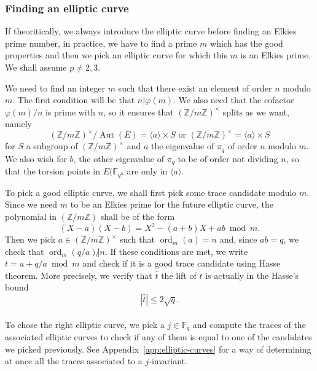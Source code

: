 \documentclass[12pt]{article}
\theoremstyle{plain}
\theoremstyle{definition}
\DeclareMathOperator{\order}{ord} %
\DeclareMathOperator{\Aut}{Aut}
\def\Z{\ensuremath{\mathbb{Z}}}
\def\F{\ensuremath{\mathbb{F}}}
\begin{document}
\subsubsection{Finding an elliptic curve}
If theoritically, we always introduce the elliptic curve before finding an
Elkies prime number, in practice, we have to find a prime $m$ which has the good
properties and then we pick an elliptic curve for which this $m$ is an Elkies
prime. We shall assume $p\neq2,3$.

We need to find an integer $m$ such that there exist an element of order $n$
modulo $m$. The first condition will be that $n|\varphi(m)$. We also need 
that the cofactor $\varphi(m)/n$ is prime with $n$, so it ensures that 
$(\Z/m\Z)^{\times}$ splits as we want, namely 
\begin{equation}
(\Z/m\Z)^{\times}/\Aut(E)=\langle{a}\rangle\times S \text{ or } 
(\Z/m\Z)^{\times}=\langle{a}\rangle\times S
\end{equation}
for $S$ a subgroup of $(\Z/m\Z)^{\times}$ and $a$ the eigenvalue of $\pi_q$ of
order $n$ modulo $m$. We also wish for $b$, the other eigenvalue of $\pi_q$ to
be of order not dividing $n$, so that the torsion points in $E(\F_{q^n}$ are
only in $\langle{a}\rangle$.

To pick a good elliptic curve, we shall first pick some trace candidate modulo 
$m$. Since we need $m$ to be an Elkies prime for the future elliptic curve, the
polynomial in $(\Z/m\Z)$ shall be of the form
\begin{equation}
(X - a)(X - b) = X^2 - (a + b)X + ab \bmod m.
\end{equation}
Then we pick $a\in(\Z/m\Z)^{\times}$ such that $\order_m(a) = n$ and,
since $ab = q$, we check that $\order_m(q/a)\not| n$. If these conditions are
met, we write $t = a + q/a \bmod m$ and check if it is a good trace candidate
using Hasse theorem. More precisely, we verify that $\widehat{t}$ the lift of $t$ is
actually in the Hasse's bound
\begin{equation}
|\widehat{t}| \leq 2\sqrt{q}.
\end{equation}\\

To chose the right elliptic curve, we pick a $j\in\F_q$ and compute
the traces of the associated elliptic curves to check if any of them
is equal to one of the candidates we picked previously. See
Appendix~\ref{app:elliptic-curves} for a way of determining at once
all the traces associated to a $j$-invariant.
\end{document}
